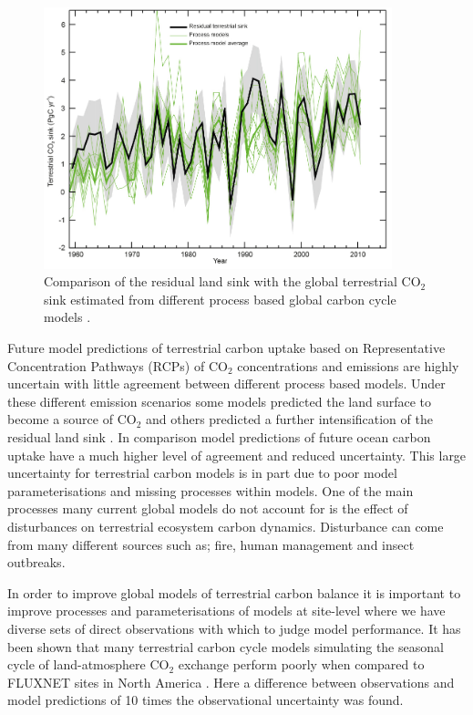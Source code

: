 \begin{figure}[ht]
    \centering
    \includegraphics[width=0.9\textwidth]{./img/intro/ipcc_fig6_16.jpg}
    \caption[Modelled residual land sink]{Comparison of the residual land sink with the global terrestrial CO\(_{2}\) sink estimated from different process based global carbon cycle models \citep{ciais2014carbon}.}
    \label{fig:ipcc_fig6.16}
\end{figure}

Future model predictions of terrestrial carbon uptake based on Representative Concentration Pathways (RCPs) \citep{moss2010next} of CO\(_{2}\) concentrations and emissions are highly uncertain with little agreement between different process based models. Under these different emission scenarios some models predicted the land surface to become a source of CO\(_{2}\) and others predicted a further intensification of the residual land sink \citep{jones2013twenty}. In comparison model predictions of future ocean carbon uptake have a much higher level of agreement and reduced uncertainty. This large uncertainty for terrestrial carbon models is in part due to poor model parameterisations and missing processes within models. One of the main processes many current global models do not account for is the effect of disturbances on terrestrial ecosystem carbon dynamics. Disturbance can come from many different sources such as; fire, human management and insect outbreaks.

In order to improve global models of terrestrial carbon balance it is important to improve processes and parameterisations of models at site-level where we have diverse sets of direct observations with which to judge model performance. It has been shown that many terrestrial carbon cycle models simulating the seasonal cycle of land-atmosphere CO\(_{2}\) exchange perform poorly when compared to FLUXNET sites in North America \citep{schwalm2010model}. Here a difference between observations and model predictions of 10 times the observational uncertainty was found.        

